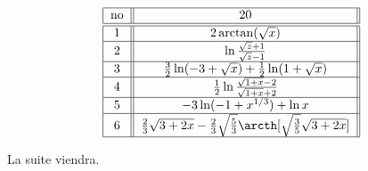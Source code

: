 \[ \begin{tabular}{| c || c ||  }
\hline       no &         ${ 20}                              $                                                                                        \\    \hline \hline
             $1$   & $2\arctan(\sqrt x)   $            \\ \hline 
            $2$   &  $ \ln\frac{\sqrt z +1}{\sqrt z -1}$                 \\ \hline

           $3$   &      $\frac{3}{2}\ln(-3+\sqrt x)+\frac{1}{2}\ln(1+\sqrt x)$ 						\\ \hline 
           $4$   &      $  \frac{1}{2}   \ln\frac{\sqrt{1+ x} -2}{\sqrt{1+x} +2}       $                                                 				\\ \hline 
           $5$	  &      $-3\ln(-1+x^{1/3})+\ln x$                                                       \\ \hline   
           $6$	  &      $\frac{2}{3}\sqrt{3+2x}-\frac{2}{3}\sqrt{\frac{5}{3}}\arcth[\sqrt{\frac{3}{5}}\sqrt{3+2x}]$                                                       \\ \hline   

\end{tabular} \]


La suite viendra.

